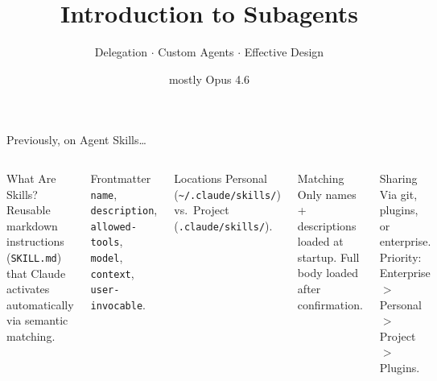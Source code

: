 \documentclass[aspectratio=169]{beamer}
\title{Introduction to Subagents}
\subtitle{Delegation $\cdot$ Custom Agents $\cdot$ Effective Design}
\author{mostly Opus 4.6}
\date{}
\begin{document}
\begin{frame}
\titlepage
\end{frame}

\begin{frame}{Previously, on Agent Skills\ldots}
\begin{columns}[T]
\begin{block}{What Are Skills?}
Reusable markdown instructions (\texttt{SKILL.md}) that Claude activates automatically via semantic matching.
\end{block}

\begin{block}{Frontmatter}
\texttt{name}, \texttt{description}, \texttt{allowed-tools}, \texttt{model}, \texttt{context}, \texttt{user-invocable}.
\end{block}

\begin{block}{Locations}
Personal (\texttt{\textasciitilde/.claude/skills/}) vs.\ Project (\texttt{.claude/skills/}).
\end{block}

\begin{block}{Matching}
Only names + descriptions loaded at startup. Full body loaded after confirmation.
\end{block}

\begin{block}{Sharing}
Via git, plugins, or enterprise. Priority: Enterprise $>$ Personal $>$ Project $>$ Plugins.
\end{block}
\end{columns}
\end{frame}
\end{document}
